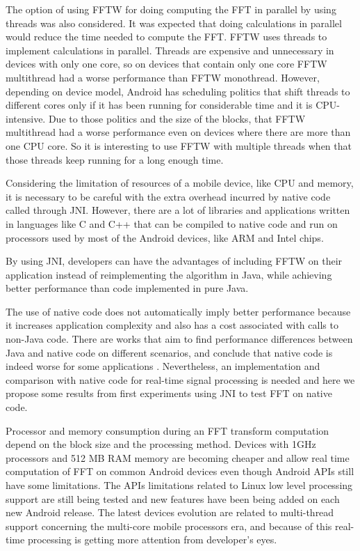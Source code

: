 \documentclass[12pt]{article}
\begin{document}
The option of using FFTW for doing computing the FFT in parallel by using threads was also considered. It was expected that doing calculations in parallel would reduce the time needed to compute the FFT. FFTW uses threads to implement calculations in parallel. Threads are expensive and unnecessary in devices with only one core, so on devices that contain only one core FFTW multithread had a worse performance than FFTW monothread. However, depending on device model, Android has scheduling politics that shift threads to different cores only if it has been running for considerable time and it is CPU-intensive. Due to those politics and the size of the blocks, that FFTW multithread had a worse performance even on devices where there are more than one CPU core. So it is interesting to use FFTW with multiple threads when that those threads keep running for a long enough time. 


 Considering the limitation of resources of a mobile device, like CPU and memory,
 it is necessary to be careful with the extra overhead incurred by native
code called through JNI. However, there are a lot of libraries  and
applications written in languages like C and C++ that can be  compiled to
native code and run on processors used by most of the Android
devices, like ARM and Intel chips.

By using
JNI, developers can have the advantages of including FFTW on their application
instead of reimplementing the algorithm in Java, while achieving
better performance than code implemented in pure Java. 


The  use of native code does not automatically imply better performance
because it increases application complexity and also has a cost associated
with calls to non-Java code. There are works that aim to find  performance
differences between Java and native code on different  scenarios, and conclude
that native code is indeed worse for some  applications \citep{6118781}.
Nevertheless, an implementation and
comparison with native code for real-time signal processing is needed and here we propose some results
from first experiments using JNI to test FFT on native code.

Processor  and memory consumption during an FFT transform computation depend on
the  block size and the processing method. Devices with 1GHz processors and
512 MB RAM memory are becoming cheaper and allow real time
computation of FFT on common Android devices even though Android APIs  still
have some limitations. The APIs limitations related to Linux low level
processing support are still being tested and new features have been being added on
each new Android release. The latest devices evolution are related  to multi-thread
support concerning the multi-core mobile processors era, and because of this real-time
processing is getting more attention from developer's  eyes.
\end{document}
